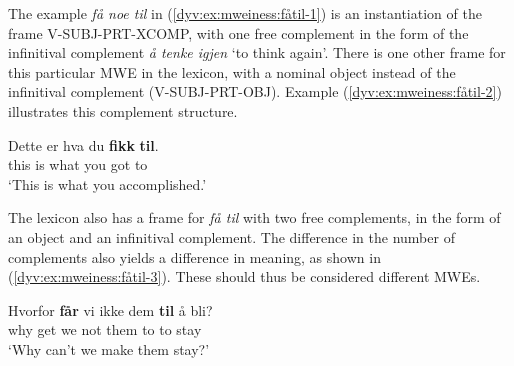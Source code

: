\documentclass[output=paper]{langsci/langscibook}
\begin{document}
The example \emph{få noe til} in (\ref{dyv:ex:mweiness:fåtil-1}) is an instantiation of the frame \textsf{V-SUBJ-PRT-XCOMP}, with one free complement in the form of the infinitival complement \emph{å tenke igjen} `to think again'.  
There is one other frame for this particular MWE in the lexicon, with a nominal object instead of the infinitival complement (\textsf{V-SUBJ-PRT-OBJ}). 
Example (\ref{dyv:ex:mweiness:fåtil-2}) illustrates this complement structure.

\ea\label{dyv:ex:mweiness:fåtil-2}
\gll Dette er hva du \textbf{fikk} \textbf{til}. \\ 
 this is what you got to \\
\glt `This is what you accomplished.' \\ 
\z

The lexicon also has a frame for \emph{få til} with two free complements, in the form of an object and an infinitival complement. 
The difference in the number of complements also yields a difference in meaning, as shown in (\ref{dyv:ex:mweiness:fåtil-3}). 
These should thus be considered different MWEs.

\ea\label{dyv:ex:mweiness:fåtil-3}
\gll Hvorfor \textbf{får} vi ikke dem \textbf{til} å bli? \\
 why get we not them to to stay \\
\glt `Why can't we make them stay?' \\ 
\z
\end{document}
